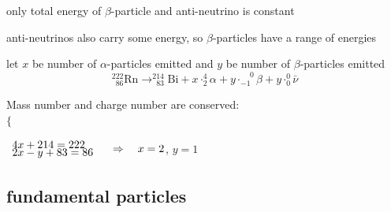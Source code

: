 only total energy of $\beta$-particle and anti-neutrino is constant

anti-neutrinos also carry some energy, so $\beta$-particles have a range of energies


\begin{soln} let $x$ be number of $\alpha$-particles emitted and $y$ be number of $\beta$-particles emitted
\begin{equation*}
	^{222}_{\phantom{2}86}\text{Rn} \longrightarrow ^{214}_{\phantom{2}83}\text{Bi} + x \cdot ^4_2 \alpha + y \cdot _{-1}^{\phantom{+}0}\beta + y \cdot _0^0 \bar{\nu}
\end{equation*}

Mass number and charge number are conserved:\\ 
$\Bigg\{$

\vspace*{-1.58\baselineskip}\hspace*{18pt} $\begin{array}{l}
4x + 214 = 222\\[-5pt]
2x - y + 83 = 86
\end{array} \quad \Rightarrow \quad x = 2$, $y=1$ \end{soln}



\subsection{fundamental particles}

